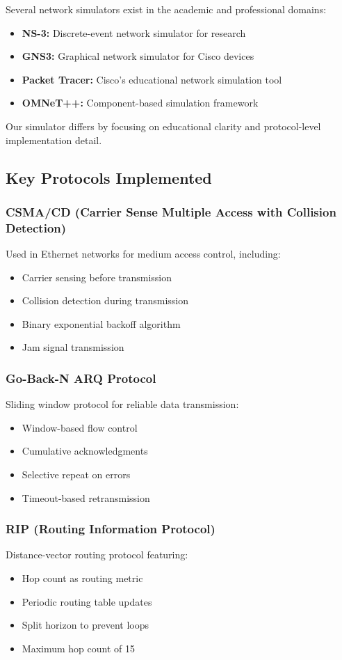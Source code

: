 \documentclass[12pt,a4paper]{article}
\begin{document}
Several network simulators exist in the academic and professional domains:

\begin{itemize}
\item \textbf{NS-3:} Discrete-event network simulator for research
\item \textbf{GNS3:} Graphical network simulator for Cisco devices
\item \textbf{Packet Tracer:} Cisco's educational network simulation tool
\item \textbf{OMNeT++:} Component-based simulation framework
\end{itemize}

Our simulator differs by focusing on educational clarity and protocol-level implementation detail.

\subsection{Key Protocols Implemented}

\subsubsection{CSMA/CD (Carrier Sense Multiple Access with Collision Detection)}
Used in Ethernet networks for medium access control, including:
\begin{itemize}
\item Carrier sensing before transmission
\item Collision detection during transmission
\item Binary exponential backoff algorithm
\item Jam signal transmission
\end{itemize}

\subsubsection{Go-Back-N ARQ Protocol}
Sliding window protocol for reliable data transmission:
\begin{itemize}
\item Window-based flow control
\item Cumulative acknowledgments
\item Selective repeat on errors
\item Timeout-based retransmission
\end{itemize}

\subsubsection{RIP (Routing Information Protocol)}
Distance-vector routing protocol featuring:
\begin{itemize}
\item Hop count as routing metric
\item Periodic routing table updates
\item Split horizon to prevent loops
\item Maximum hop count of 15
\end{itemize}
\end{document}
